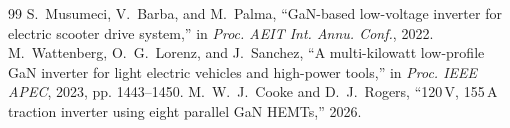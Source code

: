 \documentclass[conference]{IEEEtran}
\begin{document}
\begin{thebibliography}{99}
 S.~Musumeci, V.~Barba, and M.~Palma, ``GaN-based low-voltage inverter for electric scooter drive system,'' in \emph{Proc. AEIT Int. Annu. Conf.}, 2022.
 M.~Wattenberg, O.~G.~Lorenz, and J.~Sanchez, ``A multi-kilowatt low-profile GaN inverter for light electric vehicles and high-power tools,'' in \emph{Proc. IEEE APEC}, 2023, pp. 1443--1450.
 M.~W.~J.~Cooke and D.~J.~Rogers, ``120\,V, 155\,A traction inverter using eight parallel GaN HEMTs,'' 2026.
\end{thebibliography}
\end{document}
